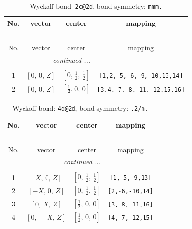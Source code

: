 \documentclass[fleqn,8pt]{jsarticle}
\begin{document}
\begin{longtable}{cccc}
\caption{Wyckoff bond: {\tt 2c@2d}, bond symmetry: {\tt mmm.}}
 \\
 \hline \hline
No. & vector & center & mapping \\ \hline \endfirsthead

\multicolumn{3}{l}{\tablename\ \thetable{}} \\
 \hline \hline
No. & vector & center & mapping \\ \hline \endhead

 \hline \hline
\multicolumn{3}{r}{\footnotesize\it continued ...} \\ \endfoot

 \hline \hline
\multicolumn{3}{r}{} \\ \endlastfoot

1 & $\left[ 0,\, 0,\, Z \right]$ & $\left[ 0,\, \frac{1}{2},\, \frac{1}{2} \right]$ & {\tt [1,2,-5,-6,-9,-10,13,14]} \\ \hline
2 & $\left[ 0,\, 0,\, Z \right]$ & $\left[ \frac{1}{2},\, 0,\, 0 \right]$ & {\tt [3,4,-7,-8,-11,-12,15,16]} \\
\end{longtable}
\renewcommand{\arraystretch}{1.2}
\begin{longtable}{cccc}
\caption{Wyckoff bond: {\tt 4d@2d}, bond symmetry: {\tt .2/m.}}
 \\
 \hline \hline
No. & vector & center & mapping \\ \hline \endfirsthead

\multicolumn{3}{l}{\tablename\ \thetable{}} \\
 \hline \hline
No. & vector & center & mapping \\ \hline \endhead

 \hline \hline
\multicolumn{3}{r}{\footnotesize\it continued ...} \\ \endfoot

 \hline \hline
\multicolumn{3}{r}{} \\ \endlastfoot

1 & $\left[ X,\, 0,\, Z \right]$ & $\left[ 0,\, \frac{1}{2},\, \frac{1}{2} \right]$ & {\tt [1,-5,-9,13]} \\ \hline
2 & $\left[ - X,\, 0,\, Z \right]$ & $\left[ 0,\, \frac{1}{2},\, \frac{1}{2} \right]$ & {\tt [2,-6,-10,14]} \\ \hline
3 & $\left[ 0,\, X,\, Z \right]$ & $\left[ \frac{1}{2},\, 0,\, 0 \right]$ & {\tt [3,-8,-11,16]} \\ \hline
4 & $\left[ 0,\, - X,\, Z \right]$ & $\left[ \frac{1}{2},\, 0,\, 0 \right]$ & {\tt [4,-7,-12,15]} \\
\end{longtable}
\end{document}
